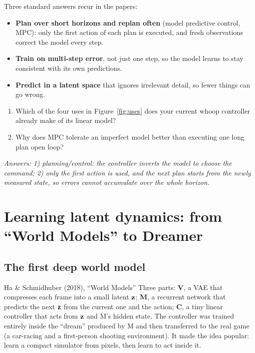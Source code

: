 Three standard answers recur in the papers:
\begin{itemize}
\item \textbf{Plan over short horizons and replan often} (model predictive control, MPC): only the first action of each plan is executed, and fresh observations correct the model every step.
\item \textbf{Train on multi-step error}, not just one step, so the model learns to stay consistent with its own predictions.
\item \textbf{Predict in a latent space} that ignores irrelevant detail, so fewer things can go wrong.
\end{itemize}

\begin{quizbox}
\begin{enumerate}[leftmargin=*]
\item Which of the four uses in Figure~\ref{fig:uses} does your current whoop controller already make of its linear model?
\item Why does MPC tolerate an imperfect model better than executing one long plan open loop?
\end{enumerate}
\emph{Answers: 1) planning/control: the controller inverts the model to choose the command; 2) only the first action is used, and the next plan starts from the newly measured state, so errors cannot accumulate over the whole horizon.}
\end{quizbox}

\section{Learning latent dynamics: from ``World Models'' to Dreamer}
\label{sec:dreamer}

\subsection{The first deep world model}
\begin{paperbox}{Ha \& Schmidhuber (2018), ``World Models''}
Three parts: \textbf{V}, a VAE that compresses each frame into a small latent $\mathbf{z}$; \textbf{M}, a recurrent network that predicts the next $\mathbf{z}$ from the current one and the action; \textbf{C}, a tiny linear controller that acts from $\mathbf{z}$ and M's hidden state. The controller was trained entirely inside the ``dream'' produced by M and then transferred to the real game (a car-racing and a first-person shooting environment). It made the idea popular: learn a compact simulator from pixels, then learn to act inside it.
\end{paperbox}


